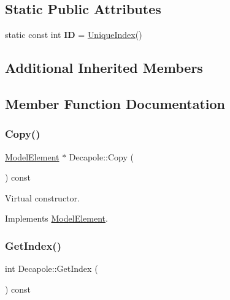 \subsection*{Static Public Attributes}
\begin{DoxyCompactItemize}
\item 
\mbox{\label{classDecapole_a71ddf08cf9b2779f95cfc616763de2c8}} 
static const int {\bfseries ID} = \hyperlink{classAcceleratorComponent_aa7ad4d39e1a488b705983842ed1ac784}{Unique\+Index}()
\end{DoxyCompactItemize}
\subsection*{Additional Inherited Members}


\subsection{Member Function Documentation}
\mbox{\label{classDecapole_a050b4c993227a975118da09b638ec450}} 
\subsubsection{\texorpdfstring{Copy()}{Copy()}}
{\footnotesize\ttfamily \hyperlink{classModelElement}{Model\+Element} $\ast$ Decapole\+::\+Copy (\begin{DoxyParamCaption}{ }\end{DoxyParamCaption}) const\hspace{0.3cm}{\ttfamily [virtual]}}

Virtual constructor. 

Implements \hyperlink{classModelElement_ac3ca26d649bd86a0f31a58ae09941429}{Model\+Element}.

\mbox{\label{classDecapole_ac34dc3e11924c94ff4464cc0ca5ddf68}} 
\subsubsection{\texorpdfstring{Get\+Index()}{GetIndex()}}
{\footnotesize\ttfamily int Decapole\+::\+Get\+Index (\begin{DoxyParamCaption}{ }\end{DoxyParamCaption}) const\hspace{0.3cm}{\ttfamily [virtual]}}

